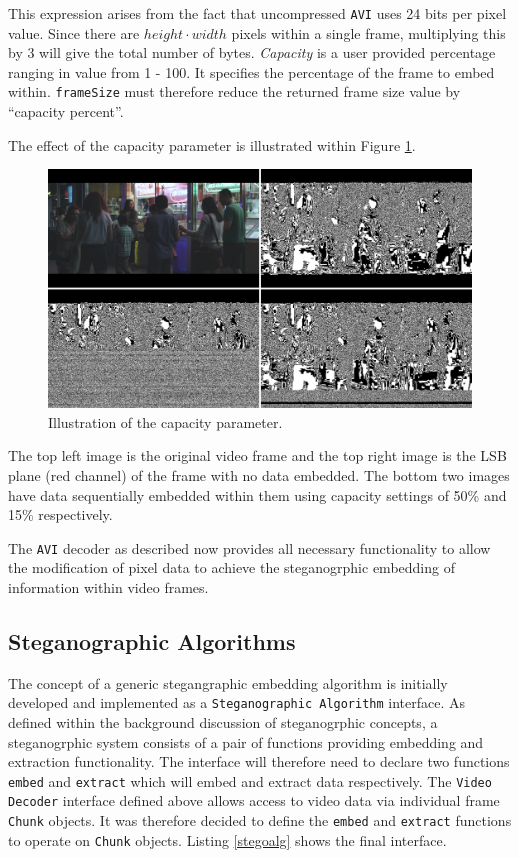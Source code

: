 \documentclass[paper=a4, fontsize=11pt,twoside]{scrartcl}
\numberwithin{table}{section}
\numberwithin{figure}{section}
\numberwithin{algorithm}{section}
\begin{document}
This expression arises from the fact that uncompressed \texttt{AVI} uses 24 bits per pixel value. Since there are $height \cdot width$ pixels within a single frame, multiplying this by 3 will give the total number of bytes. \textit{Capacity} is a user provided percentage ranging in value from 1 - 100. It specifies the percentage of the frame to embed within. \texttt{frameSize} must therefore reduce the returned frame size value by ``capacity percent''.

The effect of the capacity parameter is illustrated within Figure \ref{cap50}. 

\begin{figure}[!h]
\centerline{\includegraphics[width=\textwidth]{images/cap_ill.png}}
\caption{Illustration of the capacity parameter.}
\label{cap50}
\end{figure}

\noindent
The top left image is the original video frame and the top right image is the LSB plane (red channel) of the frame with no data embedded. The bottom two images have data sequentially embedded within them using capacity settings of 50\% and 15\% respectively.


The \texttt{AVI} decoder as described now provides all necessary functionality to allow the modification of pixel data to achieve the steganogrphic embedding of information within video frames. 


\subsection{Steganographic Algorithms}

The concept of a generic stegangraphic embedding algorithm is initially developed and implemented as a \texttt{Steganographic Algorithm} interface. As defined within the background discussion of steganogrphic concepts, a steganogrphic system consists of a pair of functions providing embedding and extraction functionality. The interface will therefore need to declare two functions \texttt{embed} and \texttt{extract} which will embed and extract data respectively. The \texttt{Video Decoder} interface defined above allows access to video data via individual frame \texttt{Chunk} objects. It was therefore decided to define the \texttt{embed} and \texttt{extract} functions to operate on \texttt{Chunk} objects. Listing \ref{stegoalg} shows the final interface.
\end{document}
